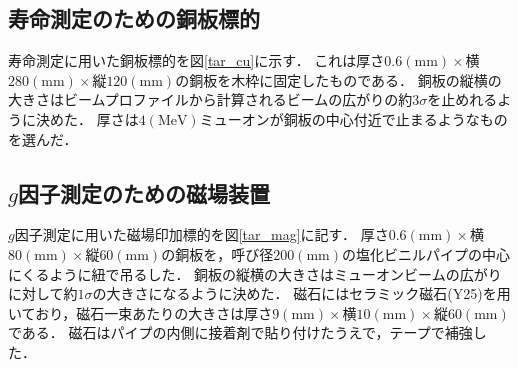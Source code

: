 



%

\subsection{寿命測定のための銅板標的}
寿命測定に用いた銅板標的を図\ref{tar_cu}に示す．
これは厚さ$0.6(\mathrm{mm})\times$横$280(\mathrm{mm})\times$縦$120(\mathrm{mm})$の銅板を木枠に固定したものである．
銅板の縦横の大きさはビームプロファイルから計算されるビームの広がりの約$3\sigma$を止めれるように決めた．
厚さは$4(\mathrm{MeV})$ミューオンが銅板の中心付近で止まるようなものを選んだ．
\subsection{$g$因子測定のための磁場装置}
$g$因子測定に用いた磁場印加標的を図\ref{tar_mag}に記す．
厚さ$0.6(\mathrm{mm})\times$横$80(\mathrm{mm})\times$縦$60(\mathrm{mm})$の銅板を，呼び径$200(\mathrm{mm})$の塩化ビニルパイプの中心にくるように紐で吊るした．
銅板の縦横の大きさはミューオンビームの広がりに対して約$1\sigma$の大きさになるように決めた．
磁石にはセラミック磁石(Y25)を用いており，磁石一束あたりの大きさは厚さ$9(\mathrm{mm})\times$横$10(\mathrm{mm})\times$縦$60(\mathrm{mm})$である．
磁石はパイプの内側に接着剤で貼り付けたうえで，テープで補強した．

